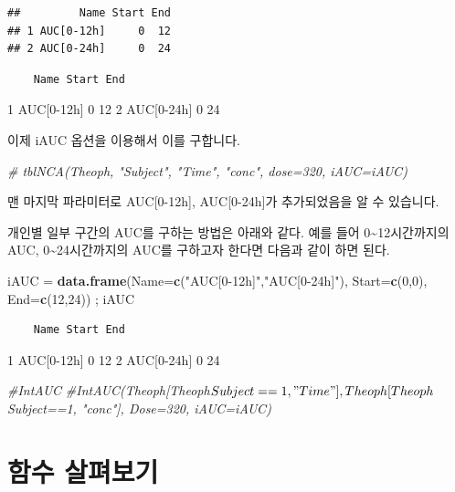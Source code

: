 \documentclass[
  12pt,
]{krantz}
\newenvironment{Shaded}{\begin{snugshade}}{\end{snugshade}}
\newcommand{\CommentTok}[1]{\textcolor[rgb]{0.56,0.35,0.01}{\textit{#1}}}
\newcommand{\DataTypeTok}[1]{\textcolor[rgb]{0.13,0.29,0.53}{#1}}
\newcommand{\DecValTok}[1]{\textcolor[rgb]{0.00,0.00,0.81}{#1}}
\newcommand{\KeywordTok}[1]{\textcolor[rgb]{0.13,0.29,0.53}{\textbf{#1}}}
\newcommand{\NormalTok}[1]{#1}
\newcommand{\StringTok}[1]{\textcolor[rgb]{0.31,0.60,0.02}{#1}}
\begin{document}
\begin{verbatim}
##         Name Start End
## 1 AUC[0-12h]     0  12
## 2 AUC[0-24h]     0  24
\end{verbatim}

\begin{verbatim}
    Name Start End
\end{verbatim}

1 AUC{[}0-12h{]} 0 12
2 AUC{[}0-24h{]} 0 24

이제 iAUC 옵션을 이용해서 이를 구합니다.

\begin{Shaded}
\begin{Highlighting}[]
\CommentTok{\# tblNCA(Theoph, "Subject", "Time", "conc", dose=320, iAUC=iAUC)}
\end{Highlighting}
\end{Shaded}

맨 마지막 파라미터로 AUC{[}0-12h{]}, AUC{[}0-24h{]}가 추가되었음을 알 수 있습니다.

개인별 일부 구간의 AUC를 구하는 방법은 아래와 같다.
예를 들어 0\textasciitilde12시간까지의 AUC, 0\textasciitilde24시간까지의 AUC를 구하고자 한다면 다음과 같이 하면 된다.

\begin{Shaded}
\begin{Highlighting}[]
\NormalTok{iAUC =}\StringTok{ }\KeywordTok{data.frame}\NormalTok{(}\DataTypeTok{Name=}\KeywordTok{c}\NormalTok{(}\StringTok{"AUC[0{-}12h]"}\NormalTok{,}\StringTok{"AUC[0{-}24h]"}\NormalTok{), }\DataTypeTok{Start=}\KeywordTok{c}\NormalTok{(}\DecValTok{0}\NormalTok{,}\DecValTok{0}\NormalTok{), }\DataTypeTok{End=}\KeywordTok{c}\NormalTok{(}\DecValTok{12}\NormalTok{,}\DecValTok{24}\NormalTok{)) ; iAUC}
\end{Highlighting}
\end{Shaded}

\begin{verbatim}
    Name Start End
\end{verbatim}

1 AUC{[}0-12h{]} 0 12
2 AUC{[}0-24h{]} 0 24

\begin{Shaded}
\begin{Highlighting}[]
\CommentTok{\#IntAUC}
\CommentTok{\#IntAUC(Theoph[Theoph$Subject==1,"Time"], Theoph[Theoph$Subject==1, "conc"], Dose=320, iAUC=iAUC)}
\end{Highlighting}
\end{Shaded}

\hypertarget{functions}{%
\section{함수 살펴보기}\label{functions}}
\end{document}
